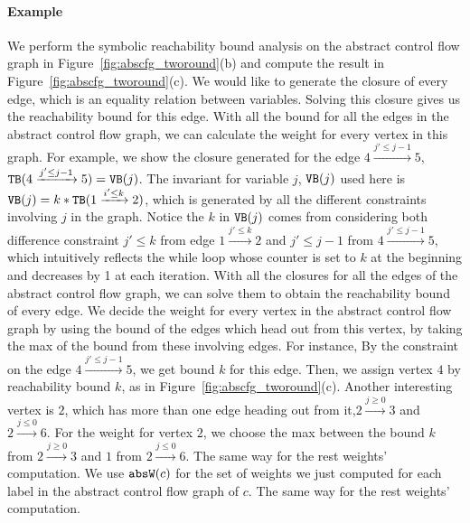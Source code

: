 \paragraph{Example}
We perform the symbolic reachability bound analysis on the abstract control flow graph in Figure~\ref{fig:abscfg_tworound}(b) and compute the result in Figure~\ref{fig:abscfg_tworound}(c).
We would like to generate the closure of every edge, which is an equality relation between variables. Solving this closure gives us the reachability bound for this edge. With all the bound for all the edges in the abstract control flow graph, we can calculate the weight for every vertex in this graph. For example, we show the closure generated for the edge 
$4 \xrightarrow{j' \leq j - 1} 5$, 
${\mathtt{TB}}(4 \xrightarrow{j' \leq j - 1} 5) = {\mathtt{VB}}(j)$. The invariant for variable $j$, ${\mathtt{VB}}(j)$ used here is 
${\mathtt{VB}}(j) = k * {\mathtt{TB}}(1 \xrightarrow{i' \leq k} 2)$, 
which is generated by all the different constraints involving $j$ in the graph.
Notice the $k$ in ${\mathtt{VB}}(j)$ comes from considering both difference constraint $j' \leq k$ from edge
$1 \xrightarrow{j' \leq k} 2$ and $j'\leq j - 1$ from $4 \xrightarrow{j' \leq j - 1} 5$, which intuitively reflects the while loop whose counter is set to $k$ at the beginning and decreases by 1 at each iteration. 
With all the closures for all the edges of the abstract control flow graph, we can solve them to obtain the reachability bound of every edge. We decide the weight for every vertex in the abstract control flow graph by using the bound of the edges which head out from this vertex, by taking the max of the bound from these involving edges. For instance, 
By the constraint on the edge $4 \xrightarrow{j' \leq j - 1} 5$, we get bound $k$ for this edge.
Then, we assign vertex $4$ by reachability bound $k$, as in Figure~\ref{fig:abscfg_tworound}(c). 
Another interesting vertex is $2$, which has more than one edge heading out from it,$2 \xrightarrow{j \geq 0} 3$ and 
$2 \xrightarrow{j \leq 0} 6$. For the weight for vertex $2$, 
we choose the max between the bound $k$ from $2 \xrightarrow{j \geq 0} 3$ and $1$ from $2 \xrightarrow{j \leq 0} 6$.
The same way for the rest weights' computation.
We use $\mathtt{abs}{\mathtt{W}}(c)$ for the set of weights we just computed 
for each label in the abstract control flow graph of $c$.
%
The same way for the rest weights' computation.

